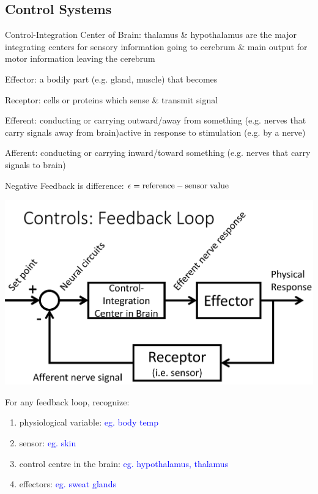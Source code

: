 \documentclass[11pt,fleqn]{book}
\begin{document}
\subsection{Control Systems}
\begin{descriptions}
    \item[Control-Integration Center of Brain:]  thalamus \& hypothalamus are the major integrating centers for sensory information going to cerebrum \& main output for motor information leaving the cerebrum
    \item[Effector:] a bodily part (e.g. gland, muscle) that becomes 
    \item[Receptor:] cells or proteins which sense \& transmit signal
    \item[Efferent:] conducting or carrying outward/away from something (e.g. nerves that carry signals away from brain)active in response to stimulation (e.g. by a nerve)
    \item[Afferent:] conducting or carrying inward/toward something (e.g. nerves that carry signals to brain)
    \item[Negative Feedback] is difference: $\epsilon={\rm reference}-{\rm sensor\;value}$
\end{descriptions}
\begin{center}
    \includegraphics[width=0.65\linewidth]{Pictures/Screenshot 2024-02-25 175821.png}
\end{center}
\begin{exercise}
    For any feedback loop, recognize:
    \begin{enumerate}
        \item physiological variable: \textcolor{blue}{eg. body temp}
        \item sensor: \textcolor{blue}{eg. skin}
        \item control centre in the brain: \textcolor{blue}{eg. hypothalamus, thalamus}
        \item effectors: \textcolor{blue}{eg. sweat glands}
    \end{enumerate}
\end{exercise}
\end{document}
